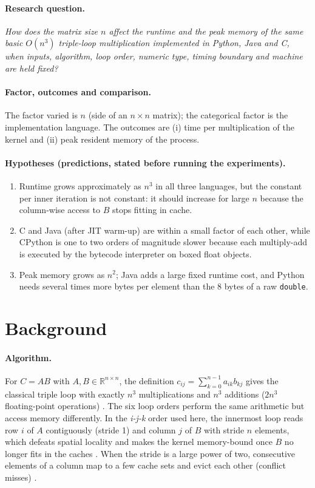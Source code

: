 \documentclass[10pt,a4paper]{article}
\begin{document}
\paragraph{Research question.} \emph{How does the matrix size $n$ affect the runtime and the
peak memory of the same basic $O(n^3)$ triple-loop multiplication implemented in Python,
Java and C, when inputs, algorithm, loop order, numeric type, timing boundary and machine are
held fixed?}

\paragraph{Factor, outcomes and comparison.} The factor varied is $n$ (side of an
$n\times n$ matrix); the categorical factor is the implementation language. The outcomes are
(i) time per multiplication of the kernel and (ii) peak resident memory of the process.

\paragraph{Hypotheses (predictions, stated before running the experiments).}
\begin{enumerate}
\item[H1] Runtime grows approximately as $n^3$ in all three languages, but the constant per
inner iteration is not constant: it should increase for large $n$ because the column-wise
access to $B$ stops fitting in cache.
\item[H2] C and Java (after JIT warm-up) are within a small factor of each other, while
CPython is one to two orders of magnitude slower because each multiply-add is executed by the
bytecode interpreter on boxed float objects.
\item[H3] Peak memory grows as $n^2$; Java adds a large fixed runtime cost, and Python needs
several times more bytes per element than the 8 bytes of a raw \texttt{double}.
\end{enumerate}

\section{Background}
\paragraph{Algorithm.} For $C=AB$ with $A,B\in\mathbb{R}^{n\times n}$, the definition
$c_{ij}=\sum_{k=0}^{n-1} a_{ik}b_{kj}$ gives the classical triple loop with exactly $n^3$
multiplications and $n^3$ additions ($2n^3$ floating-point operations) \cite{golub2013}.
The six loop orders perform the same arithmetic but access memory differently. In the
\emph{i-j-k} order used here, the innermost loop reads row $i$ of $A$ contiguously
(stride 1) and column $j$ of $B$ with stride $n$ elements, which defeats spatial locality and
makes the kernel memory-bound once $B$ no longer fits in the caches
\cite{drepper2007,hennessy2017}. When the stride is a large power of two, consecutive elements
of a column map to a few cache sets and evict each other (conflict misses) \cite{lam1991}.
\end{document}
